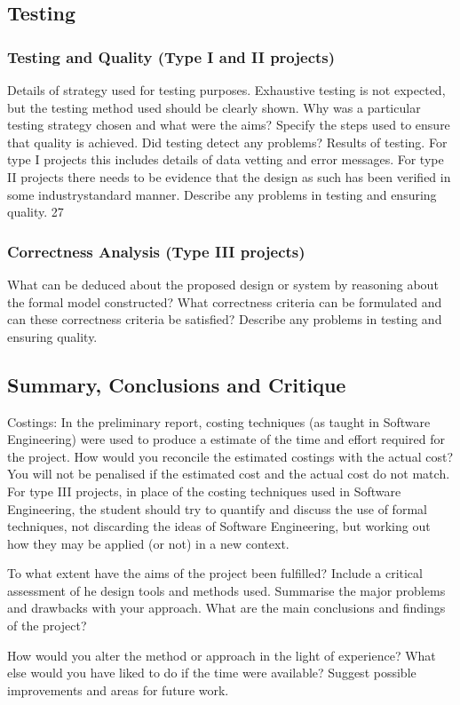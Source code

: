 \documentclass[12]{article}
\begin{document}
\subsection{Testing}
\begin{list}{}{}
\subsubsection{Testing and Quality (Type I and II projects)}
\item Details of strategy used for testing purposes.  Exhaustive testing is not expected, but the testing 
method used should be clearly shown. Why was a particular testing strategy chosen and what were the 
aims? Specify the steps used to ensure that quality is achieved. Did testing detect any problems? 
Results of testing. For type I projects this includes details of data vetting and error messages. For type 
II projects there needs to be evidence that the design as such has been verified in some industrystandard manner. Describe any problems in testing and ensuring quality.  27 
\subsubsection{Correctness Analysis (Type III projects)}
\item What can be deduced about the proposed design or system by reasoning about the formal model 
constructed? What correctness criteria can be formulated and can these correctness criteria be satisfied? 
Describe any problems in testing and ensuring quality. 
\end{list}
\subsection{Summary, Conclusions and Critique}
\begin{list}{}{}
\item Costings: In the preliminary report, costing techniques (as taught in Software Engineering) were 
used to produce a estimate of the time and effort required for the project. How would you reconcile the 
estimated costings with the actual cost? You will not be penalised if the estimated cost and the actual 
cost do not match. For type III projects, in place of the costing techniques used in Software 
Engineering, the student should try to quantify and discuss the use of formal techniques, not discarding 
the ideas of Software Engineering, but working out how they may be applied (or not) in a new context. 
\item To what extent have the aims of the project been fulfilled? Include a critical assessment of he design 
tools and methods used. Summarise the major problems and drawbacks with your approach. What are 
the main conclusions and findings of the project? 
\item How would you alter the method or approach in the light of experience? What else would you have 
liked to do if the time were available? Suggest possible improvements and areas for future work.
\end{list}
\end{document}
